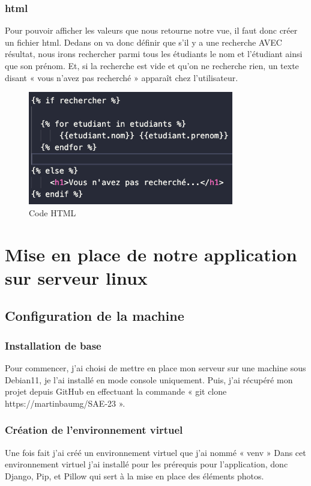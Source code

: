 \documentclass[12pt, a4paper]{article}
\begin{document}
            \subsubsection{html}
            Pour pouvoir afficher les valeurs que nous retourne notre vue, il faut donc créer un fichier html. Dedans on va donc définir que s’il y a une recherche AVEC résultat, nous irons rechercher parmi tous les étudiants le nom et l’étudiant ainsi que son prénom. Et, si la recherche est vide et qu’on ne recherche rien, un texte disant « vous n’avez pas recherché » apparaît chez l’utilisateur. 
            \begin{figure}[h]
                \centering
                \includegraphics[width=0.8\textwidth]{html.png}
                \caption{Code HTML}
                \label{fig:html}
            \end{figure}
    \newpage
    \section{Mise en place de notre application sur serveur linux}    
        \subsection{Configuration de la machine}
            \subsubsection{Installation de base}
            Pour commencer, j’ai choisi de mettre en place mon serveur sur une machine sous Debian11, je l’ai installé en mode console uniquement. Puis, j’ai récupéré mon projet depuis GitHub en effectuant la commande « git clone https://martinbaumg/SAE-23 ». 
            \subsubsection{Création de l'environnement virtuel}
            Une fois fait j’ai créé un environnement virtuel que j’ai nommé « venv » 
            Dans cet environnement virtuel j’ai installé pour les prérequis pour l’application, donc Django, Pip, et Pillow qui sert à la mise en place des éléments photos. 
\end{document}
